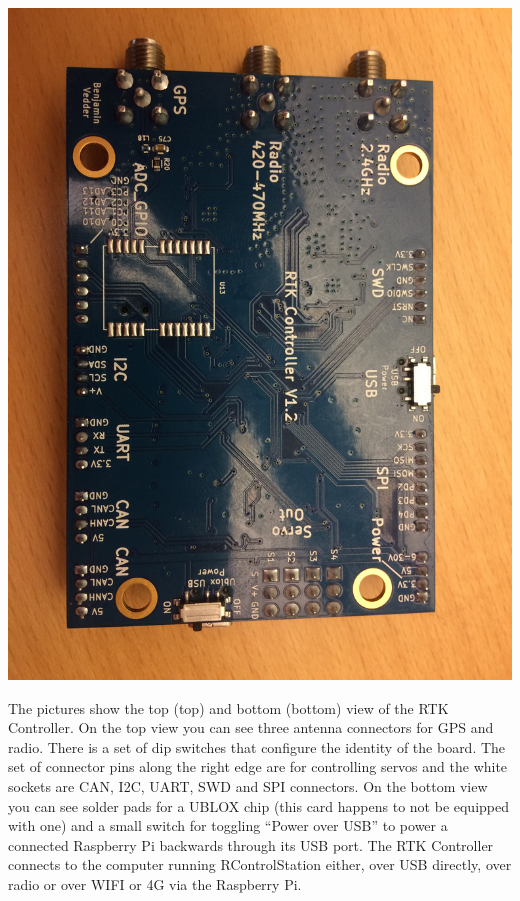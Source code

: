 \documentclass[12pt]{article} %
\begin{document}
\begin{minipage}{0.33\textwidth}
  \noindent \includegraphics[width=\textwidth]{./photos/RTKControl1.JPG}
\end{minipage}
\begin{minipage}{0.66\textwidth} %
  The pictures show the top (top) and bottom (bottom) view of the RTK
  Controller. On the top view you can see three antenna connectors for
  GPS and radio.  There is a set of dip switches that configure the
  identity of the board. The set of connector pins along the right
  edge are for controlling servos and the white sockets are CAN, I2C,
  UART, SWD and SPI connectors.  On the bottom view you can see solder
  pads for a UBLOX chip (this card happens to not be equipped with one)
  and a small switch for toggling ``Power over USB'' to power a
  connected Raspberry Pi backwards through its USB port.  The RTK
  Controller connects to the computer running RControlStation either,
  over USB directly, over radio or over WIFI or 4G via the Raspberry
  Pi.
\end{minipage}
\end{document}

